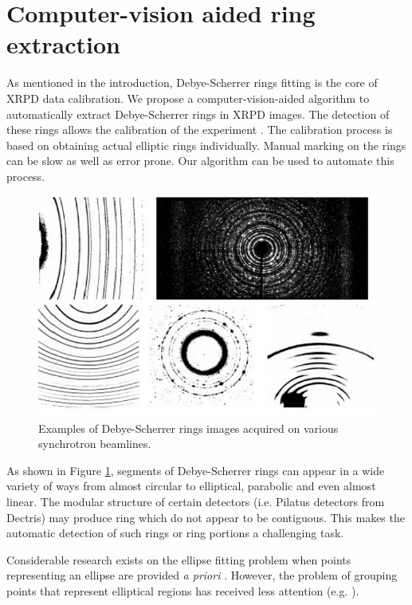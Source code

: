 \documentclass[preprint]{iucr}              %
\newcommand\dsrs{Debye-Scherrer rings}
\begin{document}
\section{Computer-vision aided ring extraction}
As mentioned in the introduction, {\dsrs} fitting is the core of XRPD data
calibration. 
We propose a computer-vision-aided algorithm to automatically extract {\dsrs} in
XRPD images. 
The detection of these rings allows the calibration of the experiment
\cite{pyFAI_2015}. 
The calibration process is based on obtaining actual elliptic rings
individually. 
Manual marking on the rings can be slow as well as error prone. 
Our algorithm can be used to automate this process.


\begin{figure}
\centering

\includegraphics[width=.85\linewidth]{Figures/dsrs_example.png}

\label{fig:examples}
\caption{Examples of \dsrs{} images acquired on various synchrotron beamlines.}
\end{figure}

As shown in Figure \ref{fig:examples}, segments of Debye-Scherrer rings can
appear in a wide variety of ways from almost circular to elliptical, parabolic
and even almost linear. 
The modular structure of certain detectors (i.e. Pilatus detectors from Dectris) 
may produce ring which do not appear to be contiguous.   
This makes the automatic detection of such rings or ring portions a challenging
task. 

Considerable research exists on the ellipse fitting problem when points
representing an ellipse are provided \textit{a priori}
\cite{gander1996least,fitzgibbon1999direct,kanatani2008compact}. However, the
problem of grouping points that represent elliptical regions has received less
attention (e.g. 
\cite{qiao2007arc,chia2011split,wong2012survey,puatruaucean12A}).     
\end{document}

